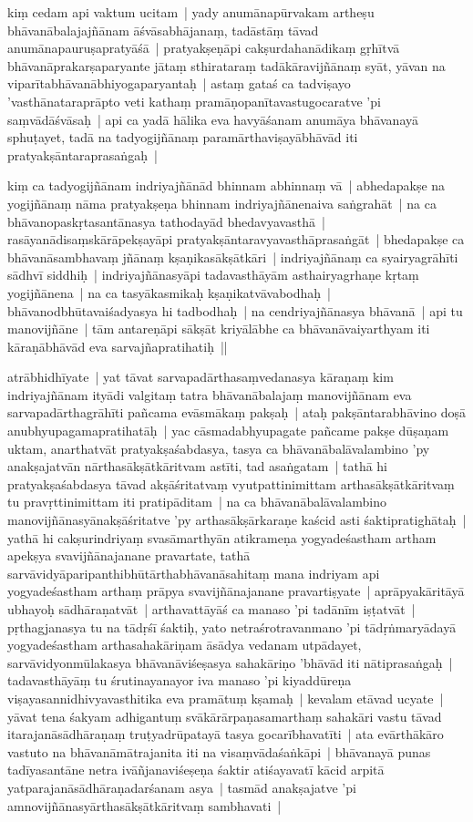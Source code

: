 \documentclass[article,12pt,a4paper]{memoir}
\begin{document}
	  \pstart kiṃ cedam api vaktum ucitam | yady anumānapūrvakam artheṣu bhāvanābalajajñānam āśvāsabhājanaṃ, tadāstāṃ tāvad anumānapauruṣapratyāśā | pratyakṣeṇāpi cakṣurdahanādikaṃ gṛhītvā bhāvanāprakarṣaparyante jātaṃ sthirataraṃ tadākāravijñānaṃ syāt, yāvan na viparītabhāvanābhiyogaparyantaḥ | astaṃ gataś ca tadviṣayo 'vasthānataraprāpto veti kathaṃ pramāṇopanītavastugocaratve 'pi saṃvādāśvāsaḥ | api ca yadā hālika eva havyāśanam anumāya bhāvanayā sphuṭayet, tadā na tadyogijñānaṃ paramārthaviṣayābhāvād iti pratyakṣāntaraprasaṅgaḥ | 
	\pend
      

	  \pstart kiṃ ca tadyogijñānam indriyajñānād bhinnam abhinnaṃ vā | abhedapakṣe na yogijñānaṃ nāma pratyakṣeṇa bhinnam indriyajñānenaiva saṅgrahāt | na ca bhāvanopaskṛtasantānasya tathodayād bhedavyavasthā | rasāyanādisaṃskārāpekṣayāpi pratyakṣāntaravyavasthāprasaṅgāt | bhedapakṣe ca bhāvanāsambhavaṃ jñānaṃ kṣaṇikasākṣātkāri | indriyajñānaṃ ca syairyagrāhīti sādhvī siddhiḥ | indriyajñānasyāpi tadavasthāyām asthairyagrhaṇe kṛtaṃ yogijñānena | na ca tasyākasmikaḥ kṣaṇikatvāvabodhaḥ | bhāvanodbhūtavaiśadyasya hi tadbodhaḥ | na cendriyajñānasya bhāvanā | api tu manovijñāne | tām antareṇāpi sākṣāt kriyālābhe ca bhāvanāvaiyarthyam iti kāraṇābhāvād eva sarvajñapratihatiḥ || 
	\pend
      

	  \pstart atrābhidhīyate | yat tāvat sarvapadārthasaṃvedanasya kāraṇaṃ kim indriyajñānam ityādi valgitaṃ tatra bhāvanābalajaṃ manovijñānam eva sarvapadārthagrāhīti pañcama evāsmākaṃ pakṣaḥ | ataḥ pakṣāntarabhāvino doṣā anubhyupagamapratihatāḥ | yac cāsmadabhyupagate pañcame pakṣe dūṣaṇam uktam, anarthatvāt pratyakṣaśabdasya, tasya ca bhāvanābalāvalambino 'py anakṣajatvān nārthasākṣātkāritvam astīti, tad asaṅgatam | tathā hi pratyakṣaśabdasya tāvad akṣāśritatvaṃ vyutpattinimittam arthasākṣātkāritvaṃ tu pravṛttinimittam iti pratipāditam | na ca bhāvanābalāvalambino manovijñānasyānakṣāśritatve 'py arthasākṣārkaraṇe kaścid asti śaktipratighātaḥ | yathā hi cakṣurindriyaṃ svasāmarthyān atikrameṇa yogyadeśastham artham apekṣya svavijñānajanane pravartate, tathā sarvāvidyāparipanthibhūtārthabhāvanāsahitaṃ mana indriyam api yogyadeśastham arthaṃ prāpya svavijñānajanane pravartiṣyate | aprāpyakāritāyā ubhayoḥ sādhāraṇatvāt | arthavattāyāś ca manaso 'pi tadānīm iṣṭatvāt | pṛthagjanasya tu na tādṛśī śaktiḥ, yato netraśrotravanmano 'pi tādṛṅmaryādayā yogyadeśastham arthasahakāriṇam āsādya vedanam utpādayet, sarvāvidyonmūlakasya bhāvanāviśeṣasya sahakāriṇo 'bhāvād iti nātiprasaṅgaḥ | tadavasthāyāṃ tu śrutinayanayor iva manaso 'pi kiyaddūreṇa viṣayasannidhivyavasthitika eva pramātuṃ kṣamaḥ | kevalam etāvad ucyate | yāvat tena śakyam adhigantuṃ svākārārpaṇasamarthaṃ sahakāri vastu tāvad itarajanāsādhāraṇaṃ truṭyadrūpatayā tasya gocarībhavatīti | ata evārthākāro vastuto na bhāvanāmātrajanita iti na visaṃvādaśaṅkāpi | bhāvanayā punas tadīyasantāne netra ivāñjanaviśeṣeṇa śaktir atiśayavatī kācid arpitā yatparajanāsādhāraṇadarśanam asya | tasmād anakṣajatve 'pi amnovijñānasyārthasākṣātkāritvaṃ sambhavati | 
	\pend
      
\end{document}
